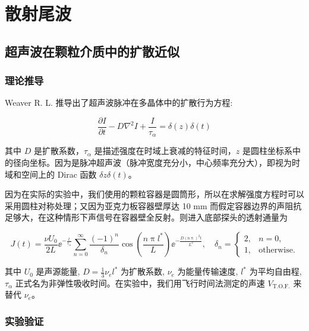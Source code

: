 
\chapter{散射尾波}

\section{超声波在颗粒介质中的扩散近似}

\subsection{理论推导}

Weaver R. L. 推导出了超声波脉冲在多晶体中的扩散行为方程\cite{diffusivity}:

\begin{equation}
  \frac{\partial I}{\partial t} - D\nabla^{2}I + \frac{I}{\tau_{\alpha}} = \delta(z)\delta(t)
\end{equation}

其中 $D$ 是扩散系数，$\tau_{\alpha}$ 是描述强度在时域上衰减的特征时间，$z$ 是圆柱坐标系中的径向坐标。因为是脉冲超声波（脉冲宽度充分小，中心频率充分大），即视为时域和空间上的 Dirac 函数 $\delta{z}\delta(t)$。

因为在实际的实验中，我们使用的颗粒容器是圆筒形，所以在求解强度方程时可以采用圆柱对称处理；又因为亚克力板容器壁厚达 10 \unit{\milli\meter} 而假定容器边界的声阻抗足够大，在这种情形下声信号在容器壁全反射。则进入底部探头的透射通量\cite{PhysRevLett.93.154303}为

\begin{equation}
  J(t) = \frac{\nu U_{0}}{2L}{\ee}^{-\frac{t}{\tau_{\alpha}}}\sum_{n=0}^{\infty}\frac{(-1)^{n}}{\delta_{n}}\cos{\left(\frac{n\uppi l^{*}}{L}\right)}{\ee}^{-\frac{D(n\uppi)^{2}t}{L^{2}}},\quad \delta_{n} = \begin{cases}
    2, & n = 0, \\
    1, & \text{otherwise}.
  \end{cases}
\end{equation}

其中 $U_{0}$ 是声源能量, $D = \frac{1}{3}\nu_{e}l^{*}$ 为扩散系数, $\nu_{e}$ 为能量传输速度, $l^{*}$ 为平均自由程, $\tau_{\alpha}$ 正式名为非弹性吸收时间。在实验中，我们用飞行时间法测定的声速 $V_{\text{T.O.F.}}$ 来替代 $\nu_{e}$。


\subsection{实验验证}



